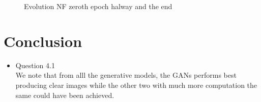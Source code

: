 \documentclass{article}
\begin{document}
\begin{itemize}
\begin{figure}[htbp]
            \caption{Evolution NF zeroth epoch halway and the end}
            \label{<label>}
          \end{figure}
        \end{itemize}
  \section{Conclusion}
        \begin{itemize}
          \item Question 4.1 \\
          We note that from alll the generative models, the GANs performs best producing clear images while the other two with much more computation the same could have been achieved. 
        \end{itemize}
    
\end{document}
